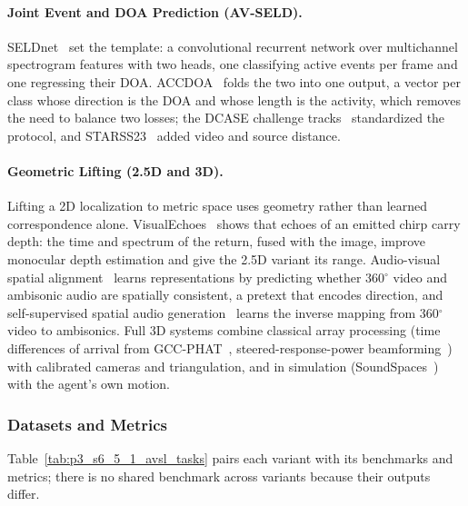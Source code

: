 \paragraph{Joint Event and DOA Prediction (AV-SELD).}
SELDnet~\cite{adavanne2018sound} set the template: a convolutional recurrent network over multichannel spectrogram features with two heads, one classifying active events per frame and one regressing their DOA. ACCDOA~\cite{shimada2021accdoa} folds the two into one output, a vector per class whose direction is the DOA and whose length is the activity, which removes the need to balance two losses; the DCASE challenge tracks~\cite{politis2020overview} standardized the protocol, and STARSS23~\cite{politis2023dataset} added video and source distance.

\paragraph{Geometric Lifting (2.5D and 3D).}
Lifting a 2D localization to metric space uses geometry rather than learned correspondence alone. VisualEchoes~\cite{gao2020visualechoes} shows that echoes of an emitted chirp carry depth: the time and spectrum of the return, fused with the image, improve monocular depth estimation and give the 2.5D variant its range. Audio-visual spatial alignment~\cite{morgado2020learning} learns representations by predicting whether 360$^\circ$ video and ambisonic audio are spatially consistent, a pretext that encodes direction, and self-supervised spatial audio generation~\cite{morgado2018self} learns the inverse mapping from 360$^\circ$ video to ambisonics. Full 3D systems combine classical array processing (time differences of arrival from GCC-PHAT~\cite{knapp1976generalized}, steered-response-power beamforming~\cite{dibiase2001robust}) with calibrated cameras and triangulation, and in simulation (SoundSpaces~\cite{chen2020soundspaces,chen2022soundspaces}) with the agent's own motion.

\subsubsection{Datasets and Metrics}

Table~\ref{tab:p3_s6_5_1_avsl_tasks} pairs each variant with its benchmarks and metrics; there is no shared benchmark across variants because their outputs differ.

